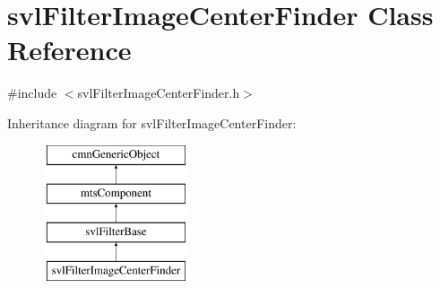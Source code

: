 \hypertarget{classsvl_filter_image_center_finder}{\section{svl\-Filter\-Image\-Center\-Finder Class Reference}
\label{classsvl_filter_image_center_finder}
}


{\ttfamily \#include $<$svl\-Filter\-Image\-Center\-Finder.\-h$>$}

Inheritance diagram for svl\-Filter\-Image\-Center\-Finder\-:\begin{figure}[H]
\begin{center}
\leavevmode
\includegraphics[height=4.000000cm]{dc/d0c/classsvl_filter_image_center_finder}
\end{center}
\end{figure}
